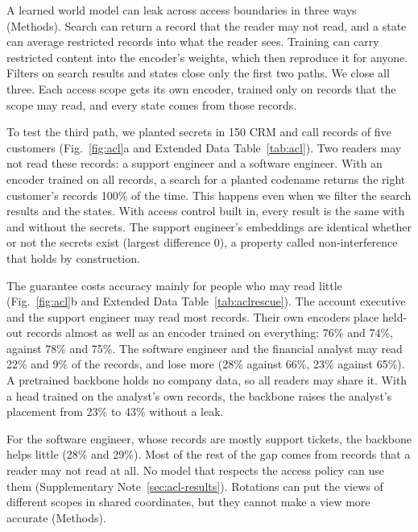 \documentclass[11pt]{article}
\begin{document}
A learned world model can leak across access boundaries in three ways (Methods). Search can return a record that the reader may not read, and a state can average restricted records into what the reader sees. Training can carry restricted content into the encoder's weights, which then reproduce it for anyone. Filters on search results and states close only the first two paths. We close all three. Each access scope gets its own encoder, trained only on records that the scope may read, and every state comes from those records.

To test the third path, we planted secrets in 150 CRM and call records of five customers (Fig.~\ref{fig:acl}a and Extended Data Table~\ref{tab:acl}). Two readers may not read these records: a support engineer and a software engineer. With an encoder trained on all records, a search for a planted codename returns the right customer's records 100\% of the time. This happens even when we filter the search results and the states. With access control built in, every result is the same with and without the secrets. The support engineer's embeddings are identical whether or not the secrets exist (largest difference 0), a property called non-interference that holds by construction\citep{tiwari2024ifc}.

The guarantee costs accuracy mainly for people who may read little (Fig.~\ref{fig:acl}b and Extended Data Table~\ref{tab:aclrescue}). The account executive and the support engineer may read most records. Their own encoders place held-out records almost as well as an encoder trained on everything: 76\% and 74\%, against 78\% and 75\%. The software engineer and the financial analyst may read 22\% and 9\% of the records, and lose more (28\% against 66\%, 23\% against 65\%). A pretrained backbone holds no company data, so all readers may share it. With a head trained on the analyst's own records, the backbone raises the analyst's placement from 23\% to 43\% without a leak.

For the software engineer, whose records are mostly support tickets, the backbone helps little (28\% and 29\%). Most of the rest of the gap comes from records that a reader may not read at all. No model that respects the access policy can use them (Supplementary Note~\ref{sec:acl-results}). Rotations can put the views of different scopes in shared coordinates, but they cannot make a view more accurate (Methods).
\end{document}
